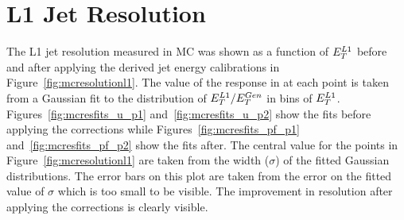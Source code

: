 \section{L1 Jet Resolution}
\label{app:closurefits}

The L1 jet resolution measured in MC was shown as a function of $E_{T}^{L1}$ before and after applying
the derived jet energy calibrations in Figure~\ref{fig:mcresolutionl1}. The value of the response in at
each point is taken from a Gaussian fit to the distribution of $E_{T}^{L1}/E_{T}^{Gen}$ in bins of $E_{T}^{L1}$.
Figures~\ref{fig:mcresfits_u_p1} and~\ref{fig:mcresfits_u_p2} show the fits before applying the corrections while
Figures~\ref{fig:mcresfits_pf_p1} and~\ref{fig:mcresfits_pf_p2} show the fits after.
The central value for the points in Figure~\ref{fig:mcresolutionl1} are taken from the width ($\sigma$) of the fitted Gaussian 
distributions. The error bars on this plot are taken from the error on the fitted value of $\sigma$ which is too small to be visible.
The improvement in resolution after applying the corrections is clearly visible.
